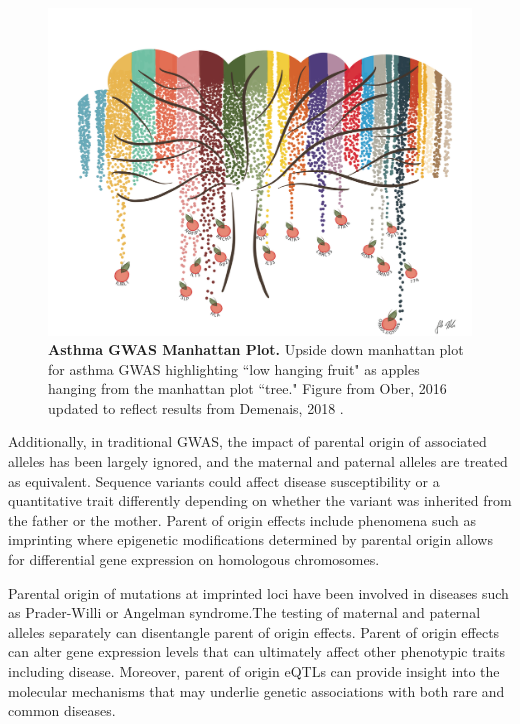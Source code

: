 \begin{figure}
\centering
\includegraphics[width=5in]{img/ch01/fig-01-lowhangingfruit.pdf}
\caption[Asthma GWAS Manhattan Plot.]{\textbf{Asthma GWAS Manhattan Plot.} Upside down manhattan plot for asthma GWAS highlighting ``low hanging fruit" as apples hanging from the manhattan plot ``tree." Figure from Ober, 2016 \cite{Ober:2016ga} updated to reflect results from Demenais, 2018 \cite{Demenais:2018hy}.}
\label{fig:fig-01-lowhangingfruit}
\end{figure}

Additionally, in traditional GWAS, the impact of parental origin of associated alleles has been largely ignored, and the maternal and paternal alleles are treated as equivalent. Sequence variants could affect disease susceptibility or a quantitative trait differently depending on whether the variant was inherited from the father or the mother. Parent of origin effects include phenomena such as imprinting where epigenetic modifications determined by parental origin allows for differential gene expression on homologous chromosomes\cite{Lokody2014,Lawson2013}. 

Parental origin of mutations at imprinted loci have been involved in diseases such as Prader-Willi or Angelman syndrome\cite{Lawson2013,Peters2014}.The testing of maternal and paternal alleles separately can disentangle parent of origin effects. Parent of origin effects can alter gene expression levels that can ultimately affect other phenotypic traits including disease. Moreover, parent of origin eQTLs can provide insight into the molecular mechanisms that may underlie genetic associations with both rare and common diseases\cite{Lawson2013,Peters2014,Kong:2009kk,Stridh2014,Falls1999}.

